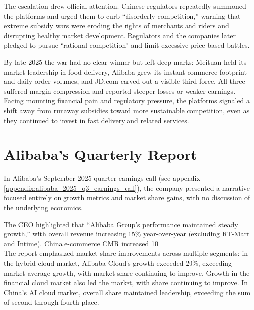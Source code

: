 The escalation drew official attention. Chinese regulators repeatedly summoned the platforms and urged them to curb ``disorderly competition,'' warning that extreme subsidy wars were eroding the rights of merchants and riders and disrupting healthy market development. Regulators and the companies later pledged to pursue ``rational competition'' and limit excessive price-based battles. 

By late 2025 the war had no clear winner but left deep marks: Meituan held its market leadership in food delivery, Alibaba grew its instant commerce footprint and daily order volumes, and JD.com carved out a visible third force. All three suffered margin compression and reported steeper losses or weaker earnings. Facing mounting financial pain and regulatory pressure, the platforms signaled a shift away from runaway subsidies toward more sustainable competition, even as they continued to invest in fast delivery and related services.
\section{Alibaba's Quarterly Report}

In Alibaba's September 2025 quarter earnings call (see appendix \ref{appendix:alibaba_2025_q3_earnings_call}), the company presented a narrative focused entirely on growth metrics and market share gains, with no discussion of the underlying economics.

The CEO highlighted that ``Alibaba Group's performance maintained steady growth,'' with overall revenue increasing 15\% year-over-year (excluding RT-Mart and Intime). China e-commerce CMR increased 10\\%

The report emphasized market share improvements across multiple segments: in the hybrid cloud market, Alibaba Cloud's growth exceeded 20\%, exceeding market average growth, with market share continuing to improve. Growth in the financial cloud market also led the market, with share continuing to improve. In China's AI cloud market, overall share maintained leadership, exceeding the sum of second through fourth place.

